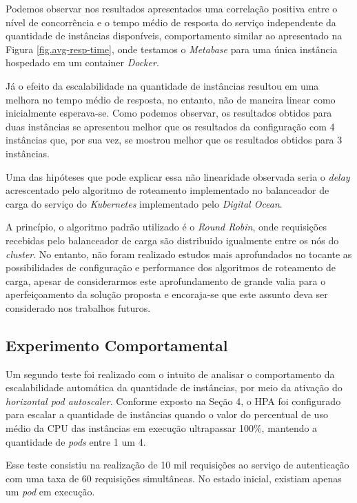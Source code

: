 Podemos observar nos resultados apresentados uma correlação positiva entre o nível de concorrência e o tempo médio de resposta do serviço independente da quantidade de instâncias disponíveis, comportamento similar ao apresentado na Figura \ref{fig.avg-resp-time}, onde testamos o \textit{Metabase} para uma única instância hospedado em um container \textit{Docker}. 

Já o efeito da escalabilidade na quantidade de instâncias resultou em uma melhora no tempo médio de resposta, no entanto, não de maneira linear como inicialmente esperava-se. Como podemos observar, os resultados obtidos para duas instâncias se apresentou melhor que os resultados da configuração com 4 instâncias que, por sua vez, se mostrou melhor que os resultados obtidos para 3 instâncias. 

Uma das hipóteses que pode explicar essa não linearidade observada seria o \textit{delay} acrescentado pelo algoritmo de roteamento implementado no balanceador de carga do serviço do \textit{Kubernetes} implementado pelo \textit{Digital Ocean}. 

A princípio, o algoritmo padrão utilizado é o \textit{Round Robin}, onde requisições recebidas pelo balanceador de carga são distribuido igualmente entre os nós do \textit{cluster}. No entanto, não foram realizado estudos mais aprofundados no tocante as possibilidades de configuração e performance dos algoritmos de roteamento de carga, apesar de considerarmos este aprofundamento de grande valia para o aperfeiçoamento da solução proposta e encoraja-se que este assunto deva ser considerado nos trabalhos futuros.

\subsection{Experimento Comportamental}

Um segundo teste foi realizado com o intuito de analisar o comportamento da escalabilidade automática da quantidade de instâncias, por meio da ativação do \textit{horizontal pod autoscaler}. Conforme exposto na Seção 4, o HPA foi configurado para escalar a quantidade de instâncias quando o valor do percentual de uso médio da CPU das instâncias em execução ultrapassar 100\%, mantendo a quantidade de \textit{pods} entre 1 um 4. 

Esse teste consistiu na realização de 10 mil requisições ao serviço de autenticação com uma taxa de 60 requisições simultâneas. No estado inicial, existiam apenas um \textit{pod} em execução. 

